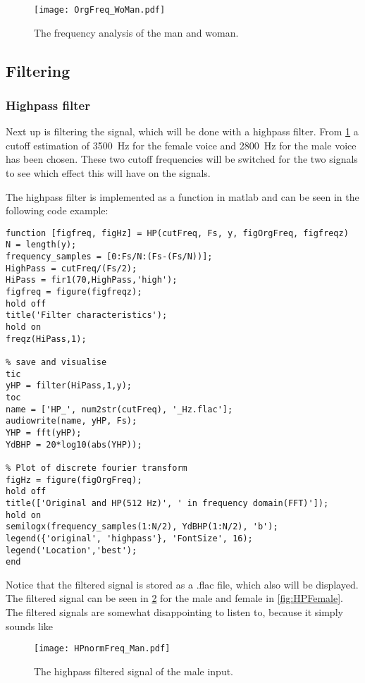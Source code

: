 \begin{figure}[h]
	\centering
	\texttt{[image: OrgFreq\_WoMan.pdf]}
	\caption{The frequency analysis of the man and woman.}
	\label{fig:WoManFFT}
\end{figure}

\subsection{Filtering}

\subsubsection{Highpass filter}
Next up is filtering the signal, which will be done with a highpass filter. From \cref{fig:WoManFFT} a cutoff estimation of \SI{3500}{\hertz} for the female voice and \SI{2800}{\hertz} for the male voice has been chosen. These two cutoff frequencies will be switched for the two signals to see which effect this will have on the signals.

The highpass filter is implemented as a function in matlab and can be seen in the following code example:

\begin{verbatim}
function [figfreq, figHz] = HP(cutFreq, Fs, y, figOrgFreq, figfreqz)
N = length(y);
frequency_samples = [0:Fs/N:(Fs-(Fs/N))];
HighPass = cutFreq/(Fs/2);
HiPass = fir1(70,HighPass,'high');
figfreq = figure(figfreqz);
hold off
title('Filter characteristics');
hold on
freqz(HiPass,1);

% save and visualise 
tic
yHP = filter(HiPass,1,y);
toc
name = ['HP_', num2str(cutFreq), '_Hz.flac'];
audiowrite(name, yHP, Fs);
YHP = fft(yHP);
YdBHP = 20*log10(abs(YHP));

% Plot of discrete fourier transform
figHz = figure(figOrgFreq);
hold off
title(['Original and HP(512 Hz)', ' in frequency domain(FFT)']);
hold on
semilogx(frequency_samples(1:N/2), YdBHP(1:N/2), 'b');
legend({'original', 'highpass'}, 'FontSize', 16);
legend('Location','best');
end
\end{verbatim}

Notice that the filtered signal is stored as a .flac file, which also will be displayed. The filtered signal can be seen in \cref{fig:HPMAle} for the male and female in \cref{fig:HPFemale}. The filtered signals are somewhat disappointing to listen to, because it simply sounds like 

\begin{figure}[h]
	\centering
	\texttt{[image: HPnormFreq\_Man.pdf]}
	\caption{The highpass filtered signal of the male input.}
	\label{fig:HPMAle}
\end{figure}

